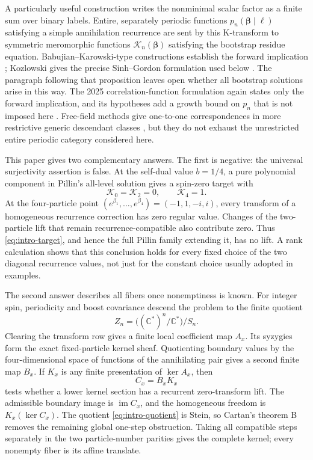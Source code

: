 \documentclass[11pt,reqno]{amsart}
\theoremstyle{definition}
\theoremstyle{remark}
\newcommand{\C}{\mathbb C}
\newcommand{\cK}{\mathcal K}
\newcommand{\im}{\operatorname{im}}
\begin{document}
A particularly useful construction writes the nonminimal scalar factor as a
finite sum over binary labels.  Entire, separately periodic functions
$p_n(\boldsymbol\beta\mid\boldsymbol\ell)$ satisfying a simple annihilation
recurrence are sent by this K-transform to symmetric meromorphic functions
$\cK_n(\boldsymbol\beta)$ satisfying the bootstrap residue equation.
Babujian--Karowski-type constructions establish the forward implication
\cite{Babujian_1999ef,Babujian_2002ef}; Kozlowski gives the precise Sinh--Gordon formulation
used below \cite[Prop.~2.3]{Kozlowski_2023ba}.  The paragraph following that
proposition leaves open whether all bootstrap solutions arise in this way.
The 2025 correlation-function formulation again states only the forward
implication, and its hypotheses add a growth bound on $p_n$ that is not
imposed here
\cite[Prop.~2.1]{Kozlowski_2025om}.  Free-field methods give one-to-one
correspondences in more restrictive generic descendant classes
\cite{Lukyanov_1995ff,Feigin_2009ff}, but they do not exhaust the unrestricted entire periodic
category considered here.

This paper gives two complementary answers.  The first is negative: the
universal surjectivity assertion is false.  At the self-dual value
$b=1/4$, a pure polynomial component in Pillin's all-level solution gives a
spin-zero target with
\begin{equation}
 \cK_0=\cK_2=0,
 \qquad \cK_4=1.
 \label{eq:intro-target}
\end{equation}
At the four-particle point
$(e^{\beta_1},\ldots,e^{\beta_4})=(-1,1,-i,i)$, every transform of a
homogeneous recurrence correction has zero regular value.  Changes of the
two-particle lift that remain recurrence-compatible also contribute zero.
Thus \eqref{eq:intro-target}, and hence the full Pillin family extending it,
has no lift.  A rank calculation shows that this conclusion holds for every
fixed choice of the two diagonal recurrence values, not just for the constant
choice usually adopted in examples.

The second answer describes all fibers once nonemptiness is known.  For
integer spin, periodicity and boost covariance descend the problem to the
finite quotient
\begin{equation}
 Z_n=\bigl((\C^*)^n/\C^*\bigr)/S_n.
 \label{eq:intro-quotient}
\end{equation}
Clearing the transform row gives a finite local coefficient map $A_x$.
Its syzygies form the exact fixed-particle kernel sheaf.  Quotienting boundary
values by the four-dimensional space of functions of the annihilating pair
gives a second finite map $B_x$.  If $K_x$ is any finite presentation of
$\ker A_x$, then
\begin{equation}
 C_x=B_xK_x
 \label{eq:intro-C}
\end{equation}
tests whether a lower kernel section has a recurrent zero-transform lift.
The admissible boundary image is $\im C_x$, and the homogeneous freedom is
$K_x(\ker C_x)$.  The quotient \eqref{eq:intro-quotient} is Stein, so Cartan's
theorem B removes the remaining global one-step obstruction.  Taking all
compatible steps separately in the two particle-number parities gives the
complete kernel; every nonempty fiber is its affine translate.
\end{document}
